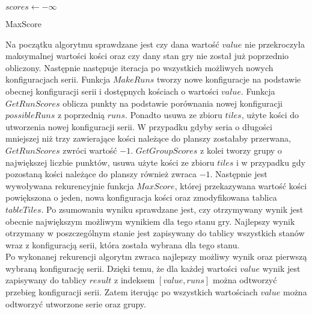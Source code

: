 \begin{pseudokod}[H]
	\vskip 1mm
	$scores \leftarrow -\infty$\;
	\caption{MaxScore}\label{alg:mine}
\end{pseudokod}
\vskip 3mm

Na początku algorytmu sprawdzane jest czy dana wartość $value$ nie przekroczyła maksymalnej wartości kości oraz czy dany stan gry nie został już poprzednio obliczony. Następnie następuje iteracja po wszystkich możliwych nowych konfiguracjach serii. Funkcja $MakeRuns$ tworzy nowe konfiguracje na podstawie obecnej konfiguracji serii i dostępnych kościach o wartości $value$. Funkcja $GetRunScores$ oblicza punkty na podstawie porównania nowej konfiguracji $possibleRuns$ z poprzednią $runs$. Ponadto usuwa ze zbioru $tiles$, użyte kości do utworzenia nowej konfiguracji serii. W przypadku gdyby seria o długości mniejszej niż trzy zawierające kości należące do planszy zostałaby przerwana, $GetRunScores$ zwróci wartość $-1$. $GetGroupScores$ z kolei tworzy grupy o największej liczbie punktów, usuwa użyte kości ze zbioru $tiles$ i w przypadku gdy pozostaną kości należące do planszy również zwraca $-1$. Następnie jest wywoływana rekurencyjnie funkcja $MaxScore$, której przekazywana wartość kości powiększona o jeden, nowa konfiguracja kości oraz zmodyfikowana tablica $tableTiles$. Po zsumowaniu wyniku sprawdzane jest, czy otrzymywany wynik jest obecnie największym możliwym wynikiem dla tego stanu gry.
Najlepszy wynik otrzymany w poszczególnym stanie jest zapisywany do tablicy wszystkich stanów wraz z konfiguracją serii, która została wybrana dla tego stanu. \\

Po wykonanej rekurencji algorytm zwraca najlepszy możliwy wynik oraz pierwszą wybraną konfigurację serii. Dzięki temu, że dla każdej wartości $value$ wynik jest zapisywany do tablicy $result$ z indeksem $[value, runs]$ można odtworzyć przebieg konfiguracji serii. Zatem iterując po wszystkich wartościach $value$ można odtworzyć utworzone serie oraz grupy.



